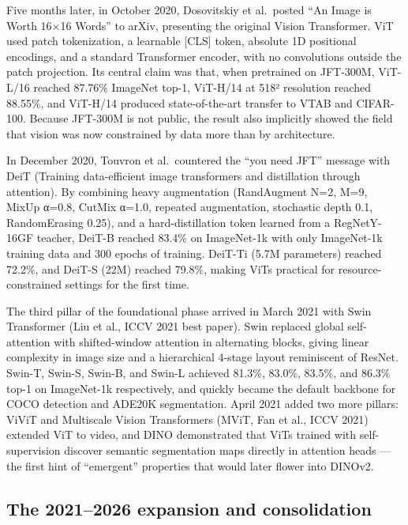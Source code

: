 \documentclass{article}
\begin{document}
Five months later, in October 2020, Dosovitskiy et al.~posted ``An Image is Worth 16×16 Words'' to arXiv, presenting the original Vision Transformer. ViT used patch tokenization, a learnable {[}CLS{]} token, absolute 1D positional encodings, and a standard Transformer encoder, with no convolutions outside the patch projection. Its central claim was that, when pretrained on JFT-300M, ViT-L/16 reached 87.76\% ImageNet top-1, ViT-H/14 at 518² resolution reached 88.55\%, and ViT-H/14 produced state-of-the-art transfer to VTAB and CIFAR-100. Because JFT-300M is not public, the result also implicitly showed the field that vision was now constrained by data more than by architecture.

In December 2020, Touvron et al.~countered the ``you need JFT'' message with DeiT (Training data-efficient image transformers and distillation through attention). By combining heavy augmentation (RandAugment N=2, M=9, MixUp α=0.8, CutMix α=1.0, repeated augmentation, stochastic depth 0.1, RandomErasing 0.25), and a hard-distillation token learned from a RegNetY-16GF teacher, DeiT-B reached 83.4\% on ImageNet-1k with only ImageNet-1k training data and 300 epochs of training. DeiT-Ti (5.7M parameters) reached 72.2\%, and DeiT-S (22M) reached 79.8\%, making ViTs practical for resource-constrained settings for the first time.

The third pillar of the foundational phase arrived in March 2021 with Swin Transformer (Liu et al., ICCV 2021 best paper). Swin replaced global self-attention with shifted-window attention in alternating blocks, giving linear complexity in image size and a hierarchical 4-stage layout reminiscent of ResNet. Swin-T, Swin-S, Swin-B, and Swin-L achieved 81.3\%, 83.0\%, 83.5\%, and 86.3\% top-1 on ImageNet-1k respectively, and quickly became the default backbone for COCO detection and ADE20K segmentation. April 2021 added two more pillars: ViViT \citep{arnab2021vivitavideovisiont} and Multiscale Vision Transformers (MViT, Fan et al., ICCV 2021) extended ViT to video, and DINO \citep{caron2021emergingproperties} demonstrated that ViTs trained with self-supervision discover semantic segmentation maps directly in attention heads --- the first hint of ``emergent'' properties that would later flower into DINOv2.

\subsection{The 2021--2026 expansion and consolidation}\label{the-20212026-expansion-and-consolidation}
\end{document}
